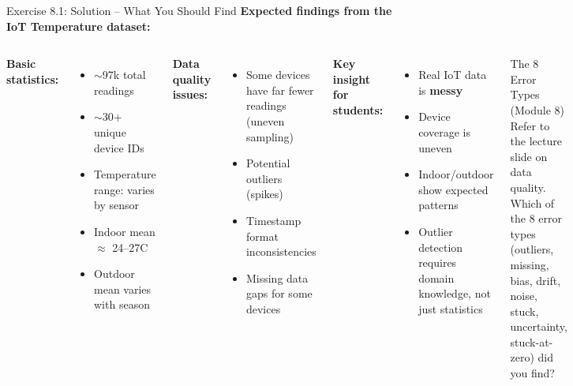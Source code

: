 \documentclass[aspectratio=169,11pt]{beamer}
\begin{document}
\begin{frame}{Exercise 8.1: Solution -- What You Should Find}
    \textbf{Expected findings from the IoT Temperature dataset:}

    \vspace{0.2cm}
    \begin{columns}
        \textbf{Basic statistics:}
        \begin{itemize}
            \item $\sim$97k total readings
            \item $\sim$30+ unique device IDs
            \item Temperature range: varies by sensor
            \item Indoor mean $\approx$ 24--27\textdegree C
            \item Outdoor mean varies with season
        \end{itemize}

        \vspace{0.2cm}
        \textbf{Data quality issues:}
        \begin{itemize}
            \item Some devices have far fewer readings (uneven sampling)
            \item Potential outliers (spikes)
            \item Timestamp format inconsistencies
            \item Missing data gaps for some devices
        \end{itemize}

        \textbf{Key insight for students:}
        \begin{itemize}
            \item Real IoT data is \textbf{messy}
            \item Device coverage is uneven
            \item Indoor/outdoor show expected patterns
            \item Outlier detection requires domain knowledge, not just statistics
        \end{itemize}

        \vspace{0.2cm}
        \begin{exampleblock}{The 8 Error Types (Module 8)}
            Refer to the lecture slide on data quality. Which of the 8 error types (outliers, missing, bias, drift, noise, stuck, uncertainty, stuck-at-zero) did you find?
        \end{exampleblock}
    \end{columns}
\end{frame}
\end{document}
